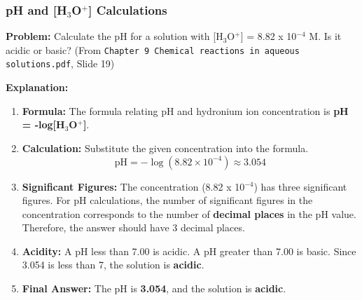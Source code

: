 \documentclass{article}
\begin{document}
\bigskip
\subsubsection*{pH and [H\(_3\)O\(^+\)] Calculations}
\textbf{Problem:} Calculate the pH for a solution with [H\(_3\)O\(^+\)] = 8.82 x 10\(^{-4}\) M. Is it acidic or basic? (From \texttt{Chapter 9 Chemical reactions in aqueous solutions.pdf}, Slide 19)

\textbf{Explanation:}
\begin{enumerate}[itemsep=5pt]
    \item \textbf{Formula:} The formula relating pH and hydronium ion concentration is \textbf{pH = -log[H\(_3\)O\(^+\)]}.
    \item \textbf{Calculation:} Substitute the given concentration into the formula.
    \[ \text{pH} = -\log(8.82 \times 10^{-4}) \approx 3.054 \]
    \item \textbf{Significant Figures:} The concentration (8.82 x 10\(^{-4}\)) has three significant figures. For pH calculations, the number of significant figures in the concentration corresponds to the number of \textbf{decimal places} in the pH value. Therefore, the answer should have 3 decimal places.
    \item \textbf{Acidity:} A pH less than 7.00 is acidic. A pH greater than 7.00 is basic. Since 3.054 is less than 7, the solution is \textbf{acidic}.
    \item \textbf{Final Answer:} The pH is \textbf{3.054}, and the solution is \textbf{acidic}.
\end{enumerate}


\newpage


\end{document}
